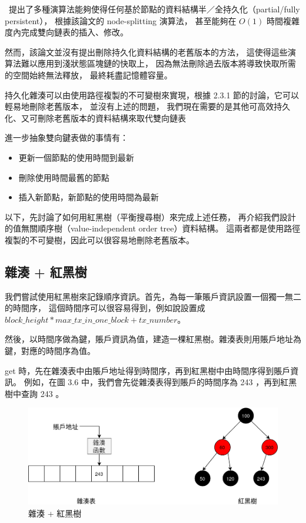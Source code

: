 ~\cite{driscoll1986making}提出了多種演算法能夠使得任何基於節點的資料結構半／全持久化（partial/fully persistent），
根據該論文的 node-splitting 演算法，
甚至能夠在 $O(1)$ 時間複雜度內完成雙向鏈表的插入、修改。

然而，該論文並沒有提出刪除持久化資料結構的老舊版本的方法，
這使得這些演算法難以應用到淺狀態區塊鏈的快取上，
因為無法刪除過去版本將導致快取所需的空間始終無法釋放，
最終耗盡記憶體容量。

持久化雜湊可以由使用路徑複製的不可變樹來實現\cite{bagwell2001ideal}，根據 2.3.1 節的討論，它可以輕易地刪除老舊版本，
並沒有上述的問題，
我們現在需要的是其他可高效持久化、又可刪除老舊版本的資料結構來取代雙向鏈表

進一步抽象雙向鍵表做的事情有：

\begin{itemize}
  \item 更新一個節點的使用時間到最新
  \item 刪除使用時間最舊的節點
  \item 插入新節點，新節點的使用時間為最新
\end{itemize}

以下，先討論了如何用紅黑樹\cite{guibas1978dichromatic}（平衡搜尋樹）來完成上述任務，
再介紹我們設計的值無關順序樹（value-independent order tree）資料結構。
這兩者都是使用路徑複製的不可變樹，因此可以很容易地刪除老舊版本。

\subsection{雜湊 + 紅黑樹}

我們嘗試使用紅黑樹來記錄順序資訊。首先，為每一筆賬戶資訊設置一個獨一無二的時間序，
這個時間序可以很容易得到，例如說設置成 $block\_height * max\_tx\_in\_one\_block + tx\_number$。

然後，以時間序做為鍵，賬戶資訊為值，建造一棵紅黑樹。雜湊表則用賬戶地址為鍵，對應的時間序為值。

get 時，先在雜湊表中由賬戶地址得到時間序，再到紅黑樹中由時間序得到賬戶資訊。
例如，在圖 3.6 中，我們會先從雜湊表得到賬戶的時間序為 243 ，再到紅黑樹中查詢 243 。

\begin{figure}[h!]
\includegraphics[width=\textwidth]{雜湊紅黑樹}
\caption{雜湊 + 紅黑樹}
\end{figure}

